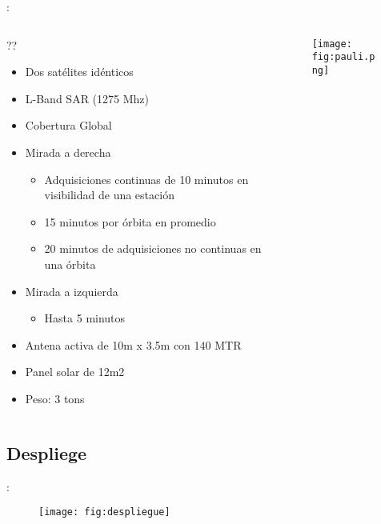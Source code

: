\begin{frame}{\secname : \subsecname}
  \begin{columns}
    \begin{column}{0.5\textwidth}
     \begin{block}{??}
\begin{itemize}
  \item Dos satélites idénticos
  \item L-Band SAR (1275 Mhz)
  \item Cobertura Global
  \item Mirada a derecha
  \begin{itemize}
    \item Adquisiciones continuas de 10 minutos en visibilidad de una estación
    \item 15 minutos por órbita en promedio
    \item 20 minutos de adquisiciones no continuas en una órbita
  \end{itemize}
  \item Mirada a izquierda
  \begin{itemize}
    \item Hasta 5 minutos
  \end{itemize}
  \item Antena activa de 10m x 3.5m con 140 MTR
  \item Panel solar de 12m2
  \item Peso: 3 tons
\end{itemize}
     \end{block}
    \end{column}
    \begin{column}{0.5\textwidth}  %
      \begin{figure}
        \centering
        \texttt{[image: fig:pauli.png]}
        \caption{}
        \label{}
      \end{figure}
    \end{column}
    \end{columns}

\end{frame}

\subsection{Despliege}
\begin{frame}{\secname : \subsecname}
  \begin{figure}
    \centering
    \texttt{[image: fig:despliegue]}
    \caption{}
    \label{}
  \end{figure}
\end{frame}
